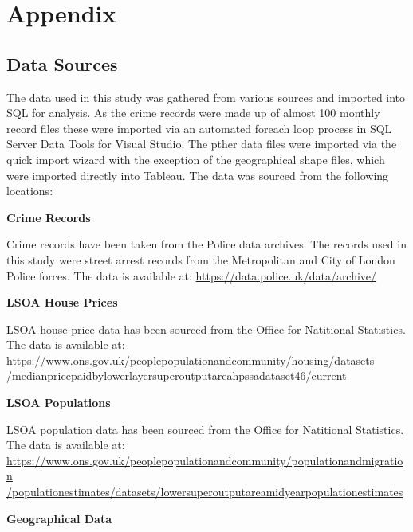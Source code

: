 \documentclass{article}
\begin{document}
\newpage
\section{Appendix} \label{Appendix}

\subsection{Data Sources}
The data used in this study was gathered from various sources and imported into SQL for analysis. As the crime records were made up of almost 100 monthly record files these were imported via an automated foreach loop process in SQL Server Data Tools for Visual Studio. The pther data files were imported via the quick import wizard with the exception of the geographical shape files, which were imported directly into Tableau. The data was sourced from the following locations:
\newline

\noindent
\textbf{Crime Records}

Crime records have been taken from the Police data archives. The records used in this study were street arrest records from the Metropolitan and City of London Police forces. The data is available at:
\newline
\href{url}{https://data.police.uk/data/archive/ }
\newline

\noindent
\textbf{LSOA House Prices}

LSOA house price data has been sourced from the Office for Natitional Statistics. The data is available at:
\newline
\href{url}{https://www.ons.gov.uk/peoplepopulationandcommunity/housing/datasets
/medianpricepaidbylowerlayersuperoutputareahpssadataset46/current}
\newline

\noindent
\textbf{LSOA Populations}

LSOA population data has been sourced from the Office for Natitional Statistics. The data is available at:
\newline
\href{url}{https://www.ons.gov.uk/peoplepopulationandcommunity/populationandmigration
/populationestimates/datasets/lowersuperoutputareamidyearpopulationestimates}
\newline

\noindent
\textbf{Geographical Data}
\end{document}
